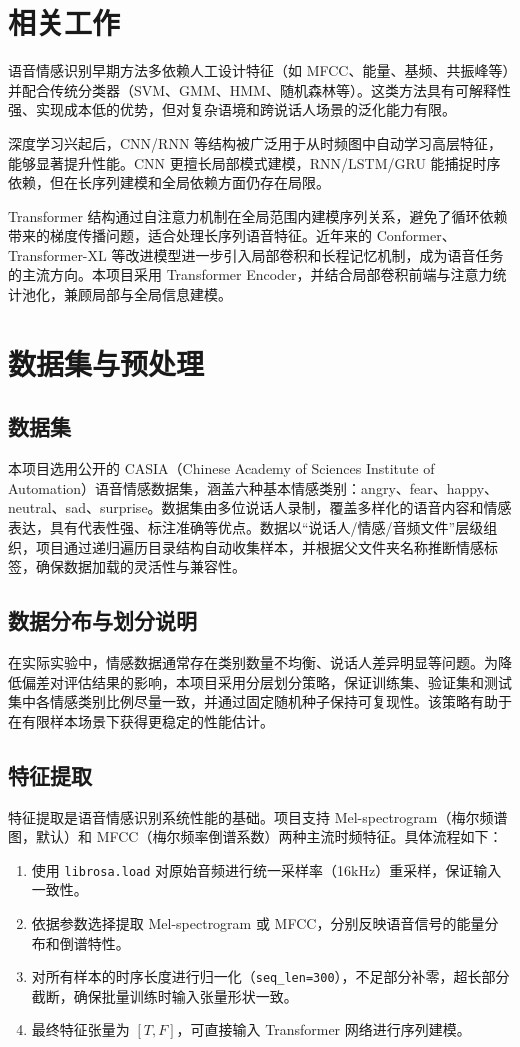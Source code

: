 \documentclass[UTF8, a4paper，12pt]{ctexart}
\begin{document}
\section{相关工作}
语音情感识别早期方法多依赖人工设计特征（如 MFCC、能量、基频、共振峰等）并配合传统分类器（SVM、GMM、HMM、随机森林等）。这类方法具有可解释性强、实现成本低的优势，但对复杂语境和跨说话人场景的泛化能力有限。

深度学习兴起后，CNN/RNN 等结构被广泛用于从时频图中自动学习高层特征，能够显著提升性能。CNN 更擅长局部模式建模，RNN/LSTM/GRU 能捕捉时序依赖，但在长序列建模和全局依赖方面仍存在局限。

Transformer 结构通过自注意力机制在全局范围内建模序列关系，避免了循环依赖带来的梯度传播问题，适合处理长序列语音特征。近年来的 Conformer、Transformer-XL 等改进模型进一步引入局部卷积和长程记忆机制，成为语音任务的主流方向。本项目采用 Transformer Encoder，并结合局部卷积前端与注意力统计池化，兼顾局部与全局信息建模。

\section{数据集与预处理}
\subsection{数据集}

本项目选用公开的 CASIA（Chinese Academy of Sciences Institute of Automation）语音情感数据集，涵盖六种基本情感类别：angry、fear、happy、neutral、sad、surprise。数据集由多位说话人录制，覆盖多样化的语音内容和情感表达，具有代表性强、标注准确等优点。数据以“说话人/情感/音频文件”层级组织，项目通过递归遍历目录结构自动收集样本，并根据父文件夹名称推断情感标签，确保数据加载的灵活性与兼容性。

\subsection{数据分布与划分说明}
在实际实验中，情感数据通常存在类别数量不均衡、说话人差异明显等问题。为降低偏差对评估结果的影响，本项目采用分层划分策略，保证训练集、验证集和测试集中各情感类别比例尽量一致，并通过固定随机种子保持可复现性。该策略有助于在有限样本场景下获得更稳定的性能估计。

\subsection{特征提取}

特征提取是语音情感识别系统性能的基础。项目支持 Mel-spectrogram（梅尔频谱图，默认）和 MFCC（梅尔频率倒谱系数）两种主流时频特征。具体流程如下：
\begin{enumerate}
  \item 使用 \texttt{librosa.load} 对原始音频进行统一采样率（16kHz）重采样，保证输入一致性。
  \item 依据参数选择提取 Mel-spectrogram 或 MFCC，分别反映语音信号的能量分布和倒谱特性。
  \item 对所有样本的时序长度进行归一化（\texttt{seq\_len=300}），不足部分补零，超长部分截断，确保批量训练时输入张量形状一致。
  \item 最终特征张量为 $[T, F]$，可直接输入 Transformer 网络进行序列建模。
\end{enumerate}
\end{document}
